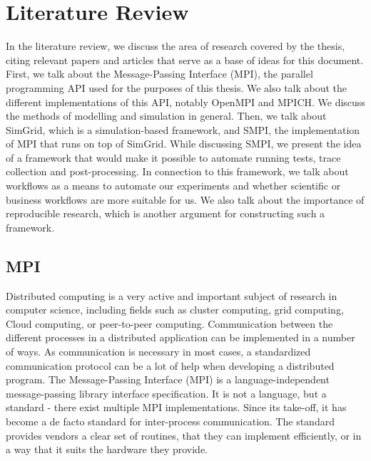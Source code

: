 
\chapter{Literature Review}
\label{Chapter2}

In the literature review, we discuss the area of research covered by
the thesis, citing relevant papers and articles that serve as a base
of ideas for this document.\\
First, we talk about the Message-Passing Interface (MPI), the parallel
programming API used for the purposes of this thesis. We also talk
about the different implementations of this API, notably OpenMPI and
MPICH. We discuss the methods of modelling and simulation in general.
Then, we talk about SimGrid, which is a simulation-based
framework, and SMPI, the implementation of MPI that runs on top of
SimGrid. While discussing SMPI, we present the idea of a framework
that would make it possible to automate running tests, trace
collection and post-processing. In connection to this framework, we
talk about workflows as a means to automate our experiments and
whether scientific or business workflows are more suitable for
us. We also talk about the importance of reproducible research, which
is another argument for constructing such a framework.
\section{MPI}
Distributed computing is a very active and important subject of research
in computer science, including fields such as cluster computing, grid
computing, Cloud computing, or peer-to-peer computing. Communication
between the different processes in a distributed application can be
implemented in a number of ways. As communication is necessary in most
cases, a standardized communication protocol can be a lot of help when
developing a distributed program. The Message-Passing Interface (MPI)
is a language-independent message-passing library
interface specification. It is not a language, but a standard - there
exist multiple MPI implementations. Since its take-off, it has become
a de facto standard for inter-process communication. The standard
provides vendors a clear set of routines, that they can implement
efficiently, or in a way that it suits the hardware they
provide.\cite{mpif12}
